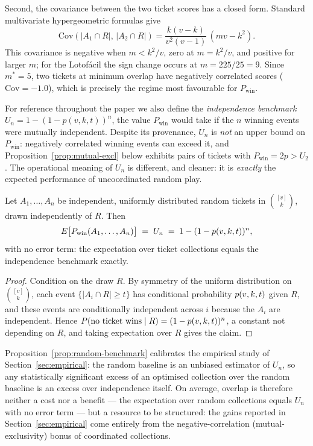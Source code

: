 Second, the covariance between the two ticket scores has a closed form.
Standard multivariate hypergeometric formulas give
\begin{equation}
  \label{eq:cov}
  \mathrm{Cov}(|A_1 \cap R|,\, |A_2 \cap R|)
  = \frac{k(v-k)}{v^2(v-1)}\,(mv - k^2).
\end{equation}
This covariance is negative when $m < k^2/v$, zero at $m = k^2/v$, and
positive for larger $m$; for the Lotof\'{a}cil the sign change occurs at
$m = 225/25 = 9$.  Since $m^* = 5$, two tickets at minimum overlap have
negatively correlated scores ($\mathrm{Cov} = -1.0$), which is precisely the
regime most favourable for $P_{\mathrm{win}}$.

For reference throughout the paper we also define the \emph{independence
benchmark} $U_n = 1-(1-p(v,k,t))^n$, the value $P_{\mathrm{win}}$ would take
if the $n$ winning events were mutually independent.  Despite its provenance,
$U_n$ is \emph{not} an upper bound on $P_{\mathrm{win}}$: negatively
correlated winning events can exceed it, and
Proposition~\ref{prop:mutual-excl} below exhibits pairs of tickets with
$P_{\mathrm{win}} = 2p > U_2$.  The operational meaning of $U_n$ is
different, and cleaner: it is \emph{exactly} the expected performance of
uncoordinated random play.

\begin{proposition}
  \label{prop:random-benchmark}
  Let $A_1, \ldots, A_n$ be independent, uniformly distributed random
  tickets in $\binom{[v]}{k}$, drawn independently of $R$.  Then
  \[
    E\bigl[P_{\mathrm{win}}(A_1,\ldots,A_n)\bigr] \;=\; U_n
    \;=\; 1 - (1-p(v,k,t))^n ,
  \]
  with no error term: the expectation over ticket collections equals the
  independence benchmark exactly.
\end{proposition}

\begin{proof}
  Condition on the draw $R$.  By symmetry of the uniform distribution on
  $\binom{[v]}{k}$, each event $\{|A_i \cap R| \ge t\}$ has conditional
  probability $p(v,k,t)$ given $R$, and these events are conditionally
  independent across $i$ because the $A_i$ are independent.  Hence
  $P(\text{no ticket wins} \mid R) = (1-p(v,k,t))^n$, a constant not depending
  on $R$, and taking expectation over $R$ gives the claim.
\end{proof}

\begin{remark}
  Proposition~\ref{prop:random-benchmark} calibrates the empirical study of
  Section~\ref{sec:empirical}: the random baseline is an unbiased estimator
  of $U_n$, so any statistically significant excess of an optimised
  collection over the random baseline is an excess over independence
  itself.  On average, overlap is therefore neither a cost nor a benefit
  --- the expectation over random collections equals $U_n$ with no error
  term --- but a resource to be structured: the gains reported in
  Section~\ref{sec:empirical} come entirely from the negative-correlation
  (mutual-exclusivity) bonus of coordinated collections.
\end{remark}

